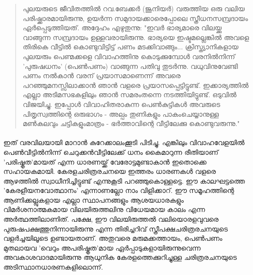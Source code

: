 \begin{quotation}
പുലയരുടെ ജീവിതത്തിൽ റവ.ബേക്കർ (ജൂനിയർ) വരുത്തിയ ഒരു വലിയ പരിഷ്ക്കാരമായിരുന്നു, ഉയർന്ന സമുദായക്കാരെപ്പോലെ സ്ത്രീധനസമ്പ്രദായം ഏർപ്പെടുത്തിയത്. അദ്ദേഹം എഴുതുന്നു: "ഇവർ ഭാര്യമാരെ വിലയ്ക്കു വാങ്ങുന്ന സമ്പ്രദായം ഉള്ളവരായിരുന്നു. ഭാര്യയെ ഇഷ്ടമല്ലെങ്കിൽ അവളെ തിരികെ വീട്ടിൽ കൊണ്ടുവിട്ടിട്ട് പണം മടക്കിവാങ്ങും... ക്രിസ്ത്യാനികളായ പുലയരും പെണ്മക്കളെ വിവാഹത്തിനു കൊടുക്കുമ്പോൾ വരനിൽനിന്ന് 'പുരുഷധനം' (പെൺപണം) വാങ്ങുന്ന പതിവു തുടർന്നു. വധുവിനുവേണ്ടി പണം നൽകാൻ വരന് പ്രയാസമാണെന്ന് അവരെ പറഞ്ഞുമനസ്സിലാക്കാൻ ഞാൻ വളരെ പ്രയാസപ്പെട്ടിട്ടുണ്ട്. ഇക്കാര്യത്തിൽ എല്ലാ അടിമസഭകളിലും ഞാൻ സമരംതന്നെ നടത്തിയിട്ടുണ്ട്. ഒടുവിൽ വിജയിച്ചു. ഇപ്പോൾ വിവാഹിതരാകുന്ന പെൺകുട്ടികൾ അവരുടെ പിതൃസ്വത്തിന്റെ ഒരുഭാഗം - അല്പം തുണികളും പാകംചെയ്യാനുള്ള മൺകലവും ചട്ടികളുംമാത്രം - ഭർത്താവിന്റെ വീട്ടിലേക്കു കൊണ്ടുവരുന്നു." 

\end{quotation}
\paragraph{}

ഇത് വരവിലയായി മാറാൻ കുറേക്കാലംക്കൂടി പിടിച്ചു. എങ്കിലും വിവാഹവേളയിൽ പെൺവീട്ടിൽനിന്ന് ചെറുക്കൻവീട്ടിലേക്ക് ധനം കൈമാറുന്ന രീതിയാണ് 'പരിഷ്കൃത'മായത് എന്ന ധാരണയ്ക്ക് വേരോട്ടമുണ്ടാകാൻ ഇതൊക്കെ സഹായകമായി. കേരളചരിത്രരചനയെ ഇത്തരം ധാരണകൾ വളരെ ആഴത്തിൽ സ്വാധീനിച്ചിട്ടുണ്ട് എന്നുകൂടി പറഞ്ഞുകൊള്ളട്ടെ. ഈ കാലഘട്ടത്തെ 'കേരളീയനവോത്ഥാനം' എന്നാണല്ലോ നാം വിളിക്കാറ്. ഈ സമൂഹത്തിന്റെ ആണിക്കല്ലുകളായ എല്ലാ സ്ഥാപനങ്ങളും ആശയധാരകളും വിമർശനാത്മകമായ വിലയിരുത്തലിനു വിധേയമായ കാലം എന്ന അർത്ഥത്തിലാണിത്. പക്ഷേ, ഈ വിലയിരുത്തൽ വലിയൊരളവുവരെ പുരുഷപക്ഷത്തുനിന്നായിരുന്നു എന്ന തിരിച്ചറിവ് സ്ത്രീപക്ഷചരിത്രരചനയുടെ വളർച്ചയിലൂടെ ഉണ്ടായതാണ്. അതുവരെ മരുമക്കത്തായം, പെൺപണം മുതലായവ 'വെറും അപരിഷ്കൃത'മായ ഏർപ്പാടുകളായിരുന്നുവെന്ന അവകാശവാദമായിരുന്നു ആധുനിക കേരളത്തെക്കുറിച്ചുള്ള ചരിത്രരചനയുടെ അടിസ്ഥാനധാരണകളിലൊന്ന്.


\paragraph{}


